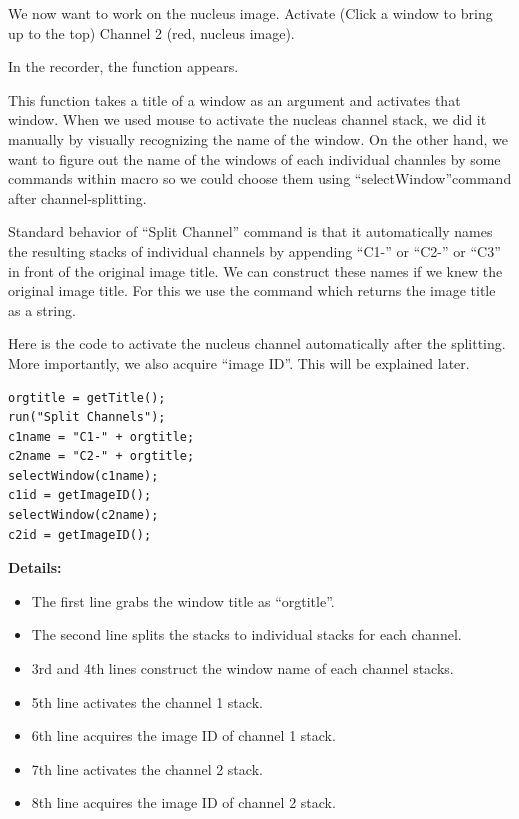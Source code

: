 We now want to work on the nucleus image. Activate (Click a window to bring up to the top) Channel 2 (red, nucleus image).

In the recorder, the function  appears. 


This function takes a title of a window as an argument and activates that window. When we used mouse to activate the nucleas channel stack, we did it manually by visually recognizing the name of the window. On the other hand, we want to figure out the name of the windows of each individual channles by some commands within macro so we could choose them using ``selectWindow''command after channel-splitting.  

Standard behavior of ``Split Channel'' command is that it automatically names the resulting stacks of individual channels by appending ``C1-'' or ``C2-'' or ``C3'' in front of the original image title. We can construct these names if we knew the original image title. For this we use the command  which returns the image title as a string. 


Here is the code to activate the nucleus channel automatically after the splitting. More importantly, we also acquire ``image ID''. This will be explained later.  

\begin{lstlisting}
orgtitle = getTitle();
run("Split Channels");
c1name = "C1-" + orgtitle;
c2name = "C2-" + orgtitle;
selectWindow(c1name);
c1id = getImageID();
selectWindow(c2name);
c2id = getImageID();
\end{lstlisting}

\textbf{Details:} 
\begin{itemize}
\item The first line grabs the window title as ``orgtitle''. 
\item The second line splits the stacks to individual stacks for each channel.
\item 3rd and 4th lines construct the window name of each channel stacks. 
\item 5th line activates the channel 1 stack. 
\item 6th line acquires the image ID of channel 1 stack. 
\item 7th line activates the channel 2 stack. 
\item 8th line acquires the image ID of channel 2 stack. 
\end{itemize}


